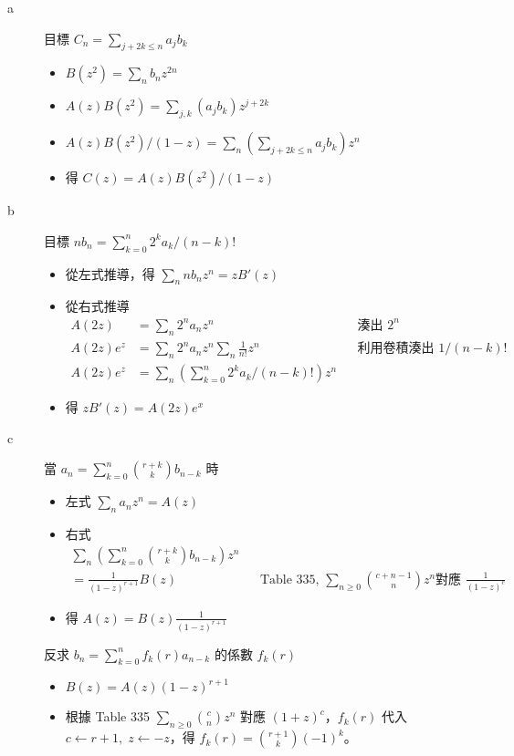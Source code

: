 \documentclass[11pt]{article}
\begin{document}
\begin{description}
	\item[a]
		目標 $C_n = \sum_{j+2k \le n} a_j b_k$
		\begin{itemize}
			\item $B(z^2) = \sum_n b_n z^{2n}$
			\item $A(z) B(z^2) = \sum_{j,k} (a_j b_k) z^{j+2k}$
			\item $A(z) B(z^2) / (1-z) = \sum_n (\sum_{j+2k \le n} a_j b_k) z^n$
			\item 得 $C(z) = A(z) B(z^2) / (1-z)$
		\end{itemize}
	\item[b]
		目標 $n b_n = \sum_{k=0}^{n} 2^k a_k / (n-k)!$
		\begin{itemize}
			\item 從左式推導，得 $\sum_n n b_n z^n = z B'(z)$
			\item 從右式推導
				\begin{align*}
					A(2z) &= \sum_n 2^n a_n z^n && \text{湊出 } 2^n\\
					A(2z) e^z &= \sum_n 2^n a_n z^n \sum_n \frac{1}{n!} z^n && \text{利用卷積湊出 } 1/(n-k)!\\
					A(2z) e^z &= \sum_n (\sum_{k=0}^n 2^k a_k /(n-k)!) z^n
				\end{align*}
			\item 得 $z B'(z) = A(2z) e^x$
		\end{itemize}
	\item[c]
		當 $a_n = \sum_{k=0}^{n} \binom{r+k}{k} b_{n-k}$ 時
		\begin{itemize}
			\item 左式 $\sum_n a_n z^n = A(z)$
			\item 右式 
				\begin{align*}
					\sum_n ( \sum_{k=0}^{n} \binom{r+k}{k} b_{n-k}) z^n \\
						= \frac{1}{(1-z)^{r+1}} B(z) && \text{Table 335, }
							\sum_{n \ge 0} \binom{c+n-1}{n} z^n \text{對應 }
							\frac{1}{(1-z)^c}
				\end{align*}
			\item 得 $A(z) = B(z) \frac{1}{(1-z)^{r+1}}$
		\end{itemize}
		反求 $b_n = \sum_{k=0}^{n} f_k(r) a_{n-k}$ 的係數 $f_k(r)$
		\begin{itemize}
			\item $B(z) = A(z) (1-z)^{r+1}$
			\item 根據 Table 335 $\sum_{n \ge 0} \binom{c}{n} z^n$ 對應 $(1+z)^c$，$f_k(r)$ 代入 $c \leftarrow r+1, \; z \leftarrow -z$，得 $f_k(r) = \binom{r+1}{k} (-1)^k$。
		\end{itemize}
\end{description}
\end{document}

